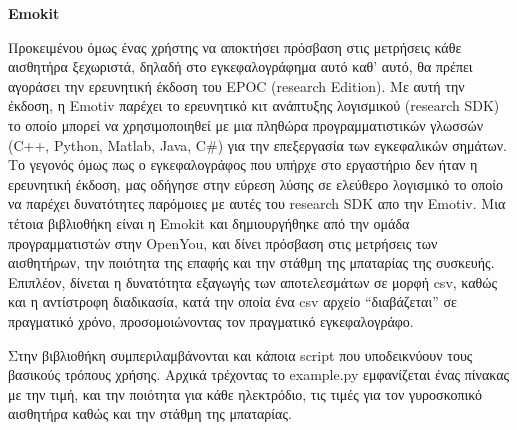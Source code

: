 \documentclass[11pt,a4paper,english,greek,twoside]{../Thesis}
\begin{document}
\textbf{Emokit}
\par Προκειμένου όμως ένας χρήστης να αποκτήσει πρόσβαση στις μετρήσεις κάθε αισθητήρα ξεχωριστά, δηλαδή στο εγκεφαλογράφημα αυτό καθ’ αυτό, θα πρέπει αγοράσει την ερευνητική έκδοση του EPOC (research Edition). Με αυτή την έκδοση, η Emotiv παρέχει το ερευνητικό κιτ ανάπτυξης λογισμικού (research SDK) το οποίο μπορεί να χρησιμοποιηθεί με μια πληθώρα προγραμματιστικών γλωσσών (C++, Python, Matlab, Java, C\#) για την επεξεργασία των εγκεφαλικών σημάτων. Το γεγονός όμως πως ο εγκεφαλογράφος που υπήρχε στο εργαστήριο δεν ήταν η ερευνητική έκδοση, μας οδήγησε στην εύρεση λύσης σε ελεύθερο λογισμικό το οποίο να παρέχει δυνατότητες παρόμοιες με αυτές του research SDK απο την Emotiv. Μια τέτοια βιβλιοθήκη είναι η Emokit και δημιουργήθηκε από την ομάδα προγραμματιστών στην OpenYou, και δίνει πρόσβαση στις μετρήσεις των αισθητήρων, την ποιότητα της επαφής και την στάθμη της μπαταρίας της συσκευής. Επιπλέον, δίνεται η δυνατότητα εξαγωγής των αποτελεσμάτων σε μορφή csv, καθώς και η αντίστροφη διαδικασία, κατά την οποία ένα csv αρχείο “διαβάζεται” σε πραγματικό χρόνο, προσομοιώνοντας τον πραγματικό εγκεφαλογράφο.

\par Στην βιβλιοθήκη συμπεριλαμβάνονται και κάποια script που υποδεικνύουν τους βασικούς τρόπους χρήσης. Αρχικά τρέχοντας το example.py εμφανίζεται ένας πίνακας με την τιμή, και την ποιότητα για κάθε ηλεκτρόδιο, τις τιμές για τον γυροσκοπικό αισθητήρα καθώς και την στάθμη της μπαταρίας.
\end{document}
